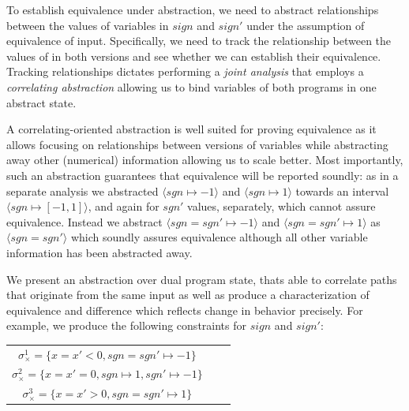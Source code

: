 To establish equivalence under abstraction, we need to abstract relationships between the values of variables in $sign$ and $sign'$ under the assumption of equivalence of input. Specifically, we need to track the relationship between the values of  in both versions and see whether we can establish their equivalence. Tracking relationships dictates performing a \emph{joint analysis} that employs a \emph{correlating abstraction} allowing us to bind variables of both programs in one abstract state.

A correlating-oriented abstraction is well suited for proving equivalence as it allows focusing on relationships between versions of variables while abstracting away other (numerical) information allowing us to scale better. Most importantly, such an abstraction guarantees that equivalence will be reported soundly: as in a separate analysis we abstracted $\langle sgn \mapsto -1 \rangle$ and $\langle sgn \mapsto 1 \rangle$ towards an interval $\langle sgn \mapsto [-1,1] \rangle$, and again for $sgn'$ values, separately, which cannot assure equivalence. Instead we abstract $\langle sgn = sgn' \mapsto -1 \rangle$ and $\langle sgn = sgn' \mapsto 1 \rangle$ as $\langle sgn = sgn' \rangle$ which soundly assures equivalence although all other variable information has been abstracted away.


We present an abstraction over dual program state, thats able to correlate paths that originate from the same input as well as produce a characterization of equivalence and difference which reflects change in behavior precisely. For example, we produce the following constraints for $sign$ and $sign'$:
\\
\begin{tabular}{ccc}
$\sigma_{\times}^1 = \{x = x' < 0, sgn = sgn' \mapsto -1\}$
\\
$\sigma_{\times}^2 = \{x = x' = 0, sgn \mapsto 1, sgn' \mapsto -1\}$
\\
$\sigma_{\times}^3 = \{x = x' > 0, sgn = sgn' \mapsto 1\}$
\\
\end{tabular}
\\

